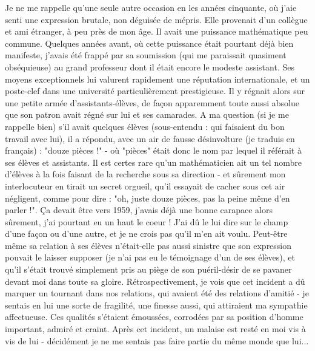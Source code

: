 Je ne me rappelle qu'une seule autre occasion en les années cinquante, où j'aie senti une expression brutale, non déguisée de mépris. Elle provenait d'un collègue et ami étranger, à peu près de mon âge. Il avait une puissance mathématique peu commune. Quelques années avant, où cette puissance était pourtant déjà bien manifeste, j'avais été frappé par sa soumission (qui me paraissait quasiment obséquieuse) au grand professeur dont il était encore le modeste assistant. Ses moyens exceptionnels lui valurent rapidement une réputation internationale, et un poste-clef dans une université particulièrement prestigieuse. Il y régnait alors sur une petite armée d'assistants-élèves, de façon apparemment toute aussi absolue que son patron avait régné sur lui et ses camarades. A ma question (si je me rappelle bien) s'il avait quelques élèves (sous-entendu : qui faisaient du bon travail avec lui), il a répondu, avec un air de fausse désinvolture (je traduis en français) : "douze pièces !" - où "pièces" était donc le nom par lequel il référait à ses élèves et assistants. Il est certes rare qu'un mathématicien ait un tel nombre d'élèves à la fois faisant de la recherche sous sa direction - et sûrement mon interlocuteur en tirait un secret orgueil, qu'il essayait de cacher sous cet air négligent, comme pour dire : "oh, juste douze pièces, pas la peine même d'en parler !". Ça devait être vers 1959, j'avais déjà une bonne carapace alors sûrement, j'ai pourtant eu un haut le coeur ! J'ai dû le lui dire sur le champ d'une façon ou d'une autre, et je ne crois pas qu'il m'en ait voulu. Peut-être même sa relation à ses élèves n'était-elle pas aussi sinistre que son expression pouvait le laisser supposer (je n'ai pas eu le témoignage d'un de ses élèves), et qu'il s'était trouvé simplement pris au piège de son puéril-désir de se pavaner devant moi dans toute sa gloire. Rétrospectivement, je vois que cet incident a dû marquer un tournant dans nos relations, qui avaient été des relations d'amitié - je sentais en lui une sorte de fragilité, une finesse aussi, qui attiraient ma sympathie affectueuse. Ces qualités s'étaient émoussées, corrodées par sa position d'homme important, admiré et craint. Après cet incident, un malaise est resté en moi vis à vis de lui - décidément je ne me sentais pas faire partie du même monde que lui...

